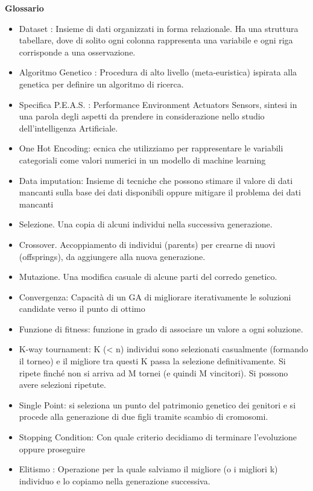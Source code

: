 \documentclass{book}
\begin{document}
\newpage
\textbf{Glossario}
\begin{itemize}
\item Dataset : Insieme di dati organizzati in forma relazionale. Ha una struttura tabellare, dove di solito ogni colonna rappresenta una variabile e ogni riga corrisponde a una osservazione.
\item Algoritmo Genetico : Procedura di alto livello (meta-euristica)
ispirata alla genetica per definire un algoritmo di ricerca. 
\item Specifica P.E.A.S. : Performance Environment Actuators Sensors, sintesi in una parola degli aspetti da prendere in considerazione nello studio dell’intelligenza Artificiale.
\item One Hot Encoding: ecnica che utilizziamo per rappresentare le variabili categoriali come valori numerici in un modello di machine learning
\item Data imputation: Insieme di tecniche che possono stimare il valore di dati mancanti sulla base dei dati disponibili oppure mitigare il problema dei dati mancanti
\item Selezione. Una copia di alcuni individui nella successiva generazione.
\item Crossover. Accoppiamento di individui (parents) per crearne di nuovi (offsprings), da aggiungere alla nuova generazione.
\item Mutazione. Una modifica casuale di alcune parti del corredo genetico.
\item Convergenza: Capacità di un GA di migliorare iterativamente le
soluzioni candidate verso il punto di ottimo
\item Funzione di fitness: funzione in grado di associare
un valore a ogni soluzione.
\item K-way tournament: K (< n) individui sono selezionati casualmente (formando il torneo) e il migliore tra questi K passa la selezione definitivamente. Si ripete finché non si arriva ad M tornei (e quindi M vincitori). Si possono avere selezioni ripetute.
\item Single Point: si seleziona un punto del patrimonio genetico dei genitori e si procede alla generazione di due figli tramite scambio di cromosomi.
\item Stopping Condition: Con quale criterio decidiamo di terminare l’evoluzione oppure proseguire
\item Elitismo : Operazione per la quale salviamo il migliore (o i migliori k) individuo e lo copiamo nella generazione successiva.

\end{itemize}



 
\end{document}
